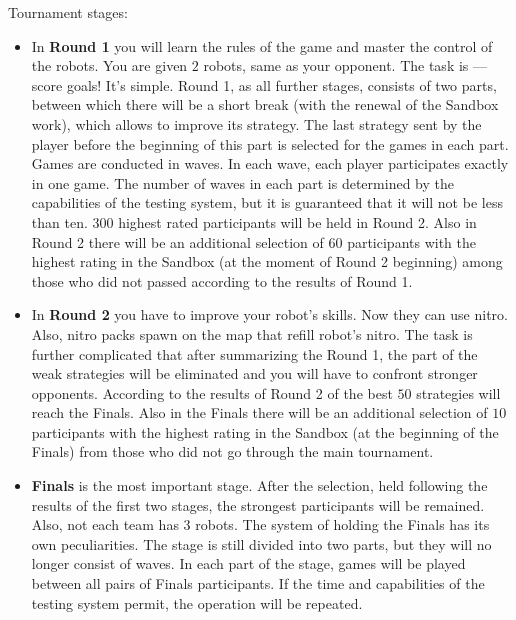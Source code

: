 Tournament stages:
\begin{itemize}
      \item
            In \textbf{Round 1} you will learn the rules of the game and master the control of the robots.
            You are given $2$ robots, same as your opponent.
            The task is --- score goals! It's simple.
            Round 1, as all further stages, consists of two parts, between which there will be a short break (with the renewal of the Sandbox work), which
            allows to improve its strategy. The last strategy sent by the player before the beginning of this part is selected for the games in each part.
            Games are conducted in waves. In each wave, each player participates exactly in one game. The number of waves in each part is determined by
            the capabilities of the testing system, but it is guaranteed that it will not be less than ten. $300$ highest rated participants
            will be held in Round 2. Also in Round 2 there will be an additional selection of $60$ participants with the highest rating in the Sandbox (at the moment
            of Round 2 beginning) among those who did not passed according to the results of Round 1.
      \item
            In \textbf{Round 2} you have to improve your robot's skills.
            Now they can use nitro.
            Also, nitro packs spawn on the map that refill robot's nitro.
            The task is further complicated
            that after summarizing the Round 1, the part of the weak strategies will be eliminated and you will have to confront stronger opponents. According
            to the results of Round 2 of the best $50$ strategies will reach the Finals. Also in the Finals there will be an additional selection of $10$ participants with
            the highest rating in the Sandbox (at the beginning of the Finals) from those who did not go through the main tournament.
      \item
            \textbf{Finals} is the most important stage. After the selection, held following the results of the first two stages, the strongest participants will be remained.
            Also, not each team has $3$ robots.
            The system of holding the Finals has its own peculiarities. The stage is still
            divided into two parts, but they will no longer consist of waves. In each part of the stage, games will be played between all pairs
            of Finals participants. If the time and capabilities of the testing system permit, the operation will be repeated.
\end{itemize}

